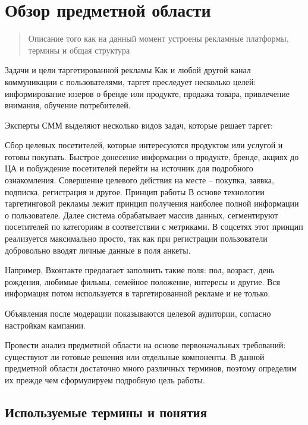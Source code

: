 \documentclass[times]{itmo-student-thesis}
\begin{document}




\chapter{Обзор предметной области}\label{chapter:1}


\startrelatedwork %

\begin{quotation}
  Описание того как на данный момент устроены рекламные платформы, термины и общая структура
\end{quotation}

Задачи и цели таргетированной рекламы
Как и любой другой канал коммуникации с пользователями, таргет преследует несколько целей: информирование юзеров о бренде или продукте, продажа товара, привлечение внимания, обучение потребителей.

Эксперты СММ выделяют несколько видов задач, которые решает таргет:

Сбор целевых посетителей, которые интересуются продуктом или услугой и готовы покупать.
Быстрое донесение информации о продукте, бренде, акциях до ЦА и побуждение посетителей перейти на источник для подробного ознакомления.
Совершение целевого действия на месте – покупка, заявка, подписка, регистрация и другое.
Принцип работы
В основе технологии таргетинговой рекламы лежит принцип получения наиболее полной информации о пользователе. Далее система обрабатывает массив данных, сегментируют посетителей по категориям в соответствии с метриками. В соцсетях этот принцип реализуется максимально просто, так как при регистрации пользователи добровольно вводят личные данные в поля анкеты.

Например, Вконтакте предлагает заполнить такие поля: пол, возраст, день рождения, любимые фильмы, семейное положение, интересы и другие. Вся информация потом используется в таргетированной рекламе и не только.

Объявления после модерации показываются целевой аудитории, согласно настройкам кампании.

	



Провести анализ предметной области на основе первоначальных требований: существуют ли готовые решения или отдельные компоненты.
В данной предметной области достаточно много различных терминов, поэтому определим их прежде чем сформулируем подробную цель работы.

\section{Используемые термины и понятия}\label{sec:terms}
\end{document}
